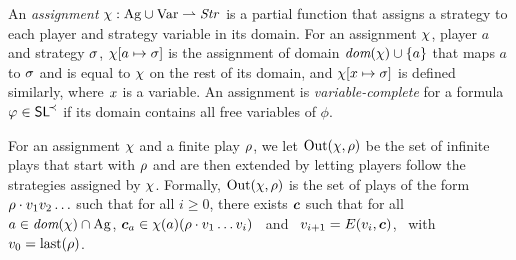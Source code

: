 An \emph{assignment}  $\chi:\textnormal{Ag}\cup\textnormal{Var} \rightharpoonup \mbox{\emph{Str}}$
is a partial function that assigns a strategy  to
each  player and strategy variable in its domain.
For an assignment
$\chi$, player $a$ and  strategy $\sigma$,
$\chi[a\mapsto\sigma]$ is the assignment of domain
$\textit{dom}(\chi)\cup\{a\}$ that maps $a$ to $\sigma$ and is equal to
$\chi$ on the rest of its domain, and 
$\chi[x\mapsto \sigma]$ is defined similarly, where $x$ is a
variable. %
An assignment is
\emph{variable-complete} for a formula $\varphi\in\textnormal{{\sffamily SL}}^{\!\prec}$ if
its domain contains all free variables of $\phi$.

For an assignment $\chi$ and a finite play $\rho$, we let
$\textnormal{Out}(\chi,\rho)$ be the set of infinite plays that start with
$\rho$ and are then extended by letting players follow the strategies
assigned by $\chi$. Formally,
 $\textnormal{Out}(\chi,\rho)$ is the set of plays of the form $\rho \cdot
 v_{1}v_{2}\ldots$ such that for all $i\geq 0$, there exists
 $\bm{c}$ such that for all $a\in\textit{dom}(\chi)\cap\textnormal{Ag}$,
 $\bm{c}_a\in\chi(a)(\rho\cdot v_{1}\ldots v_i)$ \mbox{ and }
 $v_{i+1}=E(v_{i},\bm{c})$, \mbox{ with }
 $v_{0}=\mbox{last}(\rho)$.
 

